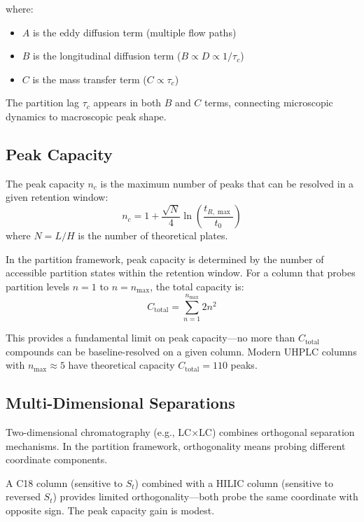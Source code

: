 \documentclass[twocolumn,superscriptaddress,prb,10pt]{revtex4-2}
\begin{document}
where:
\begin{itemize}
\item $A$ is the eddy diffusion term (multiple flow paths)
\item $B$ is the longitudinal diffusion term ($B \propto D \propto 1/\tau_c$)
\item $C$ is the mass transfer term ($C \propto \tau_c$)
\end{itemize}

The partition lag $\tau_c$ appears in both $B$ and $C$ terms, connecting microscopic dynamics to macroscopic peak shape.

\subsection{Peak Capacity}

The peak capacity $n_c$ is the maximum number of peaks that can be resolved in a given retention window:
\begin{equation}
n_c = 1 + \frac{\sqrt{N}}{4} \ln\left(\frac{t_{R,\max}}{t_0}\right)
\label{eq:peak_capacity}
\end{equation}
where $N = L/H$ is the number of theoretical plates.

In the partition framework, peak capacity is determined by the number of accessible partition states within the retention window. For a column that probes partition levels $n = 1$ to $n = n_{\max}$, the total capacity is:
\begin{equation}
C_{\text{total}} = \sum_{n=1}^{n_{\max}} 2n^2
\label{eq:total_capacity}
\end{equation}

This provides a fundamental limit on peak capacity—no more than $C_{\text{total}}$ compounds can be baseline-resolved on a given column. Modern UHPLC columns with $n_{\max} \approx 5$ have theoretical capacity $C_{\text{total}} = 110$ peaks.

\subsection{Multi-Dimensional Separations}

Two-dimensional chromatography (e.g., LC×LC) combines orthogonal separation mechanisms. In the partition framework, orthogonality means probing different coordinate components.

A C18 column (sensitive to $S_t$) combined with a HILIC column (sensitive to reversed $S_t$) provides limited orthogonality—both probe the same coordinate with opposite sign. The peak capacity gain is modest.
\end{document}
